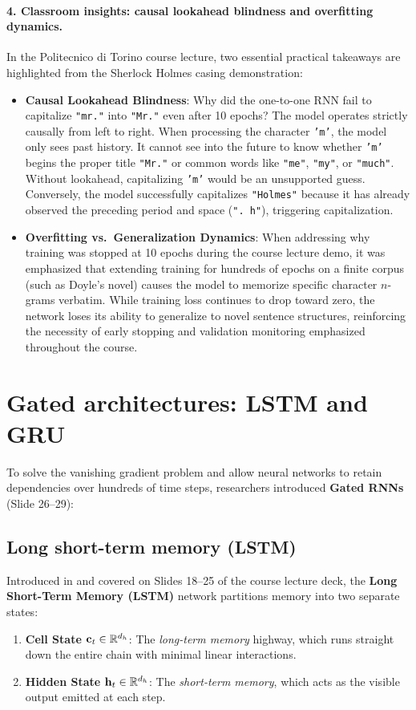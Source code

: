 \documentclass[../../main.tex]{subfiles}
\begin{document}
\paragraph{4. Classroom insights: causal lookahead blindness and overfitting dynamics.}
In the Politecnico di Torino course lecture, two essential practical takeaways are highlighted from the Sherlock Holmes casing demonstration:
\begin{itemize}
    \item \textbf{Causal Lookahead Blindness}: Why did the one-to-one RNN fail to capitalize \texttt{"mr."} into \texttt{"Mr."} even after 10 epochs? The model operates strictly causally from left to right. When processing the character \texttt{'m'}, the model only sees past history. It cannot see into the future to know whether \texttt{'m'} begins the proper title \texttt{"Mr."} or common words like \texttt{"me"}, \texttt{"my"}, or \texttt{"much"}. Without lookahead, capitalizing \texttt{'m'} would be an unsupported guess. Conversely, the model successfully capitalizes \texttt{"Holmes"} because it has already observed the preceding period and space (\texttt{". h"}), triggering capitalization.
    \item \textbf{Overfitting vs.~Generalization Dynamics}: When addressing why training was stopped at 10 epochs during the course lecture demo, it was emphasized that extending training for hundreds of epochs on a finite corpus (such as Doyle's novel) causes the model to memorize specific character $n$-grams verbatim. While training loss continues to drop toward zero, the network loses its ability to generalize to novel sentence structures, reinforcing the necessity of early stopping and validation monitoring emphasized throughout the course.
\end{itemize}

\section{Gated architectures: LSTM and GRU}
\label{sec:gated_architectures}

To solve the vanishing gradient problem and allow neural networks to retain dependencies over hundreds of time steps, researchers introduced \textbf{Gated RNNs} (Slide 26--29):

\subsection{Long short-term memory (LSTM)}
Introduced in \cite{hochreiter1997} and covered on Slides 18--25 of the course lecture deck, the \textbf{Long Short-Term Memory (LSTM)} network partitions memory into two separate states:
\begin{enumerate}
    \item \textbf{Cell State $\mathbf{c}_t \in \mathbb{R}^{d_h}$}: The \emph{long-term memory} highway, which runs straight down the entire chain with minimal linear interactions.
    \item \textbf{Hidden State $\mathbf{h}_t \in \mathbb{R}^{d_h}$}: The \emph{short-term memory}, which acts as the visible output emitted at each step.
\end{enumerate}
\end{document}
